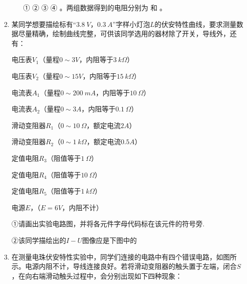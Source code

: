 \begin{enumerate}[leftmargin=0em]
\begin{enumerate}
①  
②  
③  
④  
。两组数据得到的电阻分别为  
和  
。





\end{enumerate}



\newpage
\item 
{}
某同学想要描绘标有“$ 3.8\ V $，$ 0.3\ A $”字样小灯泡$ L $的伏安特性曲线，要求测量数据尽量精确，绘制曲线完整，可供该同学选用的器材除了开关，导线外，还有：

电压表$ V_{1} $（量程$ 0 \sim 3V $，内阻等于$ 3 \ k\Omega $）

电压表$ V_{2} $（量程$ 0 \sim 15V $，内阻等于$ 15 \ k\Omega $）

电流表$ A_{1} $（量程$ 0 \sim 200 \ mA $，内阻等于$ 10 \ \Omega $）

电流表$ A_{2} $（量程$ 0 \sim 3A $，内阻等于$ 0.1 \ \Omega $）

滑动变阻器$ R_{1} $（$ 0 \sim 10 \ \Omega $，额定电流$ 2A $）

滑动变阻器$ R_{2} $（$ 0 \sim 1 \ k\Omega $，额定电流$ 0.5A $）

定值电阻$ R_{3} $（阻值等于$ 1 \ \Omega $）

定值电阻$ R_{4} $（阻值等于$ 10 \ \Omega $）

定值电阻$ R_{5} $（阻值等于$ 1 \ k\Omega $）

电源$ E $，（$ E=6V $，内阻不计）

①请画出实验电路图，并将各元件字母代码标在该元件的符号旁.

②该同学描绘出的$ I-U $图像应是下图中的  
\begin{figure}[h!]
\centering

\end{figure}


\item 
{}
在测量电珠伏安特性实验中，同学们连接的电路中有四个错误电路，如图所示。电源内阻不计，导线连接良好。若将滑动变阻器的触头置于左端，闭合$ S $，在向右端滑动触头过程中，会分别出现如下四种现象：
\begin{figure}[h!]
\centering

\end{figure}


\end{enumerate}
